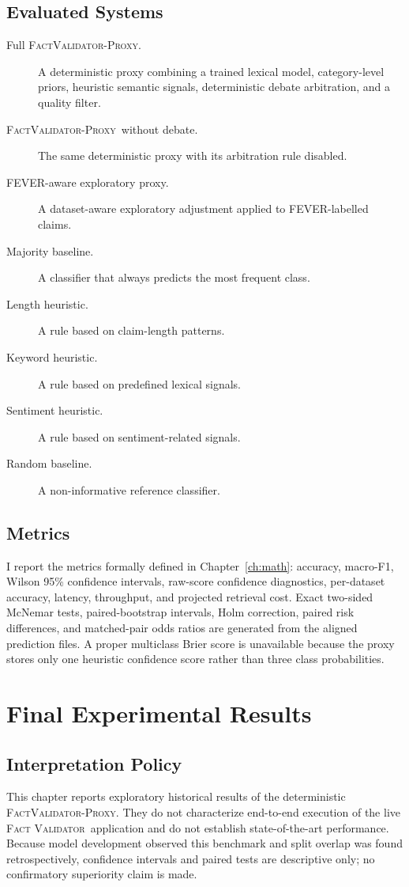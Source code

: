 \documentclass[12pt,a4paper,openany]{report}
\newcommand{\system}{\textsc{Fact Validator}}
\newcommand{\proxy}{\textsc{FactValidator-Proxy}}
\begin{document}
\section{Evaluated Systems}
\begin{description}
  \item[Full \proxy.] A deterministic proxy combining a trained lexical model, category-level priors, heuristic semantic signals, deterministic debate arbitration, and a quality filter.
  \item[\proxy\ without debate.] The same deterministic proxy with its arbitration rule disabled.
  \item[FEVER-aware exploratory proxy.] A dataset-aware exploratory adjustment applied to FEVER-labelled claims.
  \item[Majority baseline.] A classifier that always predicts the most frequent class.
  \item[Length heuristic.] A rule based on claim-length patterns.
  \item[Keyword heuristic.] A rule based on predefined lexical signals.
  \item[Sentiment heuristic.] A rule based on sentiment-related signals.
  \item[Random baseline.] A non-informative reference classifier.
\end{description}

\section{Metrics}
I report the metrics formally defined in Chapter~\ref{ch:math}: accuracy, macro-F1, Wilson 95\% confidence intervals, raw-score confidence diagnostics, per-dataset accuracy, latency, throughput, and projected retrieval cost. Exact two-sided McNemar tests, paired-bootstrap intervals, Holm correction, paired risk differences, and matched-pair odds ratios are generated from the aligned prediction files. A proper multiclass Brier score is unavailable because the proxy stores only one heuristic confidence score rather than three class probabilities.

\chapter{Final Experimental Results}
\section{Interpretation Policy}
This chapter reports exploratory historical results of the deterministic \proxy. They do not characterize end-to-end execution of the live \system\ application and do not establish state-of-the-art performance. Because model development observed this benchmark and split overlap was found retrospectively, confidence intervals and paired tests are descriptive only; no confirmatory superiority claim is made.
\end{document}
